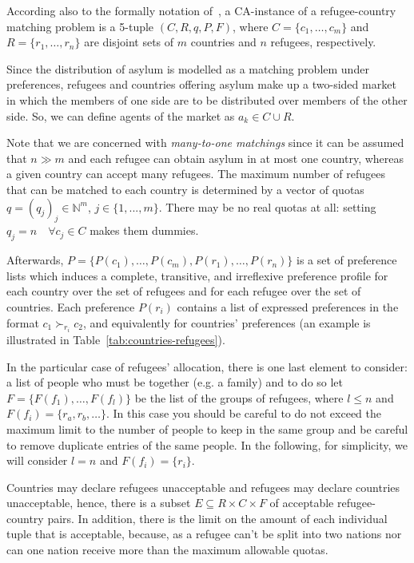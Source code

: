 \documentclass[letterpaper]{article} %
\begin{document}
    According also to the formally notation of~\citet{salles}, a CA-instance of a refugee-country matching problem is a 5-tuple $(C, R, q, P, F)$, where $C = \{c_1, \dots, c_m\}$ and $R = \{r_1, \dots, r_n\}$ are disjoint sets of $m$ countries and $n$ refugees, respectively.

    Since the distribution of asylum is modelled as a matching problem under preferences, refugees and countries offering asylum make up a two-sided market in which the members of one side are to be distributed over members of the other side.
    So, we can define agents of the market as $a_k \in C \cup R$.
    
    Note that we are concerned with \textit{many-to-one matchings} since it can be assumed that $n \gg m$ and each refugee can obtain asylum in at most one country, whereas a given country can accept many refugees. The maximum number of refugees that can be matched to each country is determined by a vector of quotas $q = (q_j)_j \in \mathbb{N}^m$, $j\in\{1,...,m\}$. There may be no real quotas at all: setting $q_j = n \quad \forall c_j \in C$ makes them dummies.

    Afterwards, $P = \{P(c_1), \dots, P(c_m), P(r_1), \dots, P(r_n)\}$ is a set of preference lists which induces a complete, transitive, and irreflexive preference profile for each country over the set of refugees and for each refugee over the set of countries.
    Each preference $P(r_i)$ contains a list of expressed preferences in the format $c_1 \succ_{r_i} c_2$, and equivalently for countries' preferences (an example is illustrated in Table~\ref{tab:countries-refugees}).

    In the particular case of refugees' allocation, there is one last element to consider: a list of people who must be together (e.g. a family) and to do so let $F=\{F(f_1), \dots, F(f_l)\}$ be the list of the groups of refugees, where $l \leq n$ and $F(f_i) = \{r_a, r_b, \dots\}$.
    In this case you should be careful to do not exceed the maximum limit to the number of people to keep in the same group and be careful to remove duplicate entries of the same people.
    In the following, for simplicity, we will consider $l=n$ and $F(f_i)=\{r_i\}$.

    Countries may declare refugees unacceptable and refugees may declare countries unacceptable, hence, there is a subset $E \subseteq R \times C \times F$ of acceptable refugee-country pairs.
    In addition, there is the limit on the amount of each individual tuple that is acceptable, because, as a refugee can't be split into two nations nor can one nation receive more than the maximum allowable quotas.
    
\end{document}

